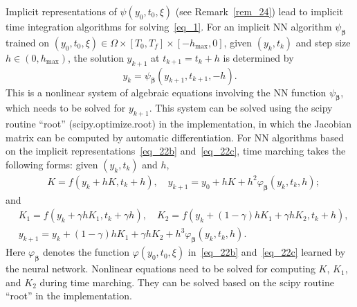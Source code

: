 \begin{remark}\label{rem_27}
  Implicit
  representations of $\psi(y_0,t_0,\xi)$ (see Remark~\ref{rem_24}) lead to
  implicit time integration algorithms
  for solving~\eqref{eq_1}.
  For an implicit NN algorithm $\psi_{\bm\beta}$
  trained on $(y_0,t_0,\xi)\in\Omega\times[T_0,T_f]\times[-h_{\max},0]$,
  given $(y_k,t_k)$
  and step size $h\in(0,h_{\max})$,
  the solution $y_{k+1}$ at $t_{k+1}=t_k+h$ is determined by
  \begin{equation}\label{eq_29}
    y_k = \psi_{\bm\beta}(y_{k+1},t_{k+1},-h).
  \end{equation}
  This is a nonlinear system of algebraic equations involving 
  the NN function $\psi_{\bm\beta}$, which needs to be solved for $y_{k+1}$.
  This system can be solved using the scipy routine ``root''
  (scipy.optimize.root) in the implementation,
  in which the Jacobian matrix can be computed
  by automatic differentiation.
  For NN algorithms based on the implicit
  representations~\eqref{eq_22b} and~\eqref{eq_22c}, time marching takes the following forms:
  given $(y_k,t_k)$ and $h$,
    \begin{align}
      & K = f(y_k+hK, t_k+h), \label{eq_30a} \quad
      y_{k+1} = y_0 + hK + h^2\varphi_{\bm\beta}(y_k,t_k,h);
    \end{align}
  and 
  \begin{subequations}
    \begin{align}
      & K_1 = f(y_k + \gamma h K_1, t_k+\gamma h), \label{eq_31a} \quad
      K_2 = f(y_k + (1-\gamma)hK_1 + \gamma hK_2, t_k+h), %
      \\
      & y_{k+1} = y_k + (1-\gamma)hK_1 + \gamma hK_2
      + h^3\varphi_{\bm\beta}(y_k,t_k,h). \label{eq_31c}
    \end{align}
  \end{subequations}
  Here $\varphi_{\bm\beta}$ denotes the
  function $\varphi(y_0,t_0,\xi)$ in~\eqref{eq_22b} and~\eqref{eq_22c}
  learned by the neural network.
  Nonlinear equations need to be solved for
  computing $K$, $K_1$,
  and $K_2$ during time marching. They can be solved
  based on the scipy routine ``root'' in the implementation.
  
\end{remark}



